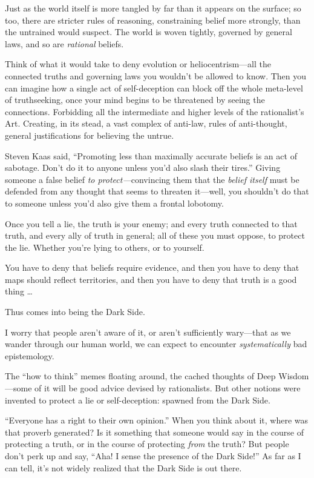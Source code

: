 {
 Just as the world itself is more tangled by far than it appears on
the surface; so too, there are stricter rules of reasoning,
constraining belief more strongly, than the untrained would suspect.
The world is woven tightly, governed by general laws, and so are
\textit{rational} beliefs.}

{
 Think of what it would take to deny evolution or
heliocentrism---all the connected truths and governing laws you
wouldn't be allowed to know. Then you can imagine how a
single act of self-deception can block off the whole meta-level of
truthseeking, once your mind begins to be threatened by seeing the
connections. Forbidding all the intermediate and higher levels of the
rationalist's Art. Creating, in its stead, a vast
complex of anti-law, rules of anti-thought, general justifications for
believing the untrue.}

{
 Steven Kaas said, ``Promoting less than maximally
accurate beliefs is an act of sabotage. Don't do it to
anyone unless you'd also slash their
tires.'' Giving someone a false belief \textit{to
protect---}convincing them that the \textit{belief itself} must be
defended from any thought that seems to threaten it---well, you
shouldn't do that to someone unless
you'd also give them a frontal lobotomy.}

{
 Once you tell a lie, the truth is your enemy; and every truth
connected to that truth, and every ally of truth in general; all of
these you must oppose, to protect the lie. Whether
you're lying to others, or to yourself.}

{
 You have to deny that beliefs require evidence, and then you have
to deny that maps should reflect territories, and then you have to deny
that truth is a good thing \ldots}

{
 Thus comes into being the Dark Side.}

{
 I worry that people aren't aware of it, or
aren't sufficiently wary---that as we wander through
our human world, we can expect to encounter \textit{systematically} bad
epistemology.}

{
 The ``how to think'' memes
floating around, the cached thoughts of Deep Wisdom---some of it will
be good advice devised by rationalists. But other notions were invented
to protect a lie or self-deception: spawned from the Dark Side.}

{
 ``Everyone has a right to their own
opinion.'' When you think about it, where was that
proverb generated? Is it something that someone would say in the course
of protecting a truth, or in the course of protecting \textit{from} the
truth? But people don't perk up and say,
``Aha! I sense the presence of the Dark
Side!'' As far as I can tell, it's
not widely realized that the Dark Side is out there.}

